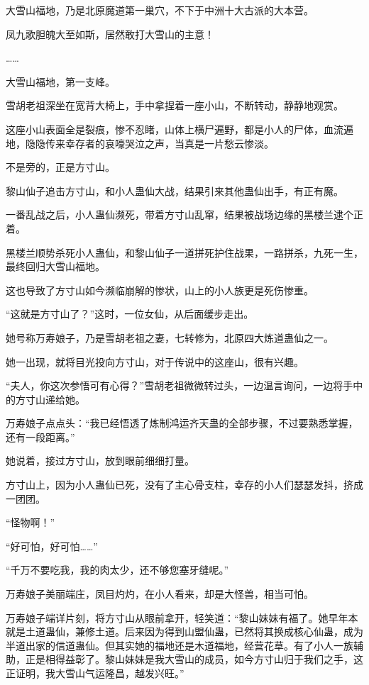 \begin{this_body}
大雪山福地，乃是北原魔道第一巢穴，不下于中洲十大古派的大本营。

凤九歌胆魄大至如斯，居然敢打大雪山的主意！

……

大雪山福地，第一支峰。

雪胡老祖深坐在宽背大椅上，手中拿捏着一座小山，不断转动，静静地观赏。

这座小山表面全是裂痕，惨不忍睹，山体上横尸遍野，都是小人的尸体，血流遍地，隐隐传来幸存者的哀嚎哭泣之声，当真是一片愁云惨淡。

不是旁的，正是方寸山。

黎山仙子追击方寸山，和小人蛊仙大战，结果引来其他蛊仙出手，有正有魔。

一番乱战之后，小人蛊仙濒死，带着方寸山乱窜，结果被战场边缘的黑楼兰逮个正着。

黑楼兰顺势杀死小人蛊仙，和黎山仙子一道拼死护住战果，一路拼杀，九死一生，最终回归大雪山福地。

这也导致了方寸山如今濒临崩解的惨状，山上的小人族更是死伤惨重。

“这就是方寸山了？”这时，一位女仙，从后面缓步走出。

她号称万寿娘子，乃是雪胡老祖之妻，七转修为，北原四大炼道蛊仙之一。

她一出现，就将目光投向方寸山，对于传说中的这座山，很有兴趣。

“夫人，你这次参悟可有心得？”雪胡老祖微微转过头，一边温言询问，一边将手中的方寸山递给她。

万寿娘子点点头：“我已经悟透了炼制鸿运齐天蛊的全部步骤，不过要熟悉掌握，还有一段距离。”

她说着，接过方寸山，放到眼前细细打量。

方寸山上，因为小人蛊仙已死，没有了主心骨支柱，幸存的小人们瑟瑟发抖，挤成一团团。

“怪物啊！”

“好可怕，好可怕……”

“千万不要吃我，我的肉太少，还不够您塞牙缝呢。”

万寿娘子美丽端庄，凤目灼灼，在小人看来，却是大怪兽，相当可怕。

万寿娘子端详片刻，将方寸山从眼前拿开，轻笑道：“黎山妹妹有福了。她早年本就是土道蛊仙，兼修土道。后来因为得到山盟仙蛊，已然将其换成核心仙蛊，成为半道出家的信道蛊仙。但其实她的福地还是木道福地，经营花草。有了小人一族辅助，正是相得益彰了。黎山妹妹是我大雪山的成员，如今方寸山归于我们之手，这正证明，我大雪山气运隆昌，越发兴旺。”


\end{this_body}
